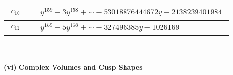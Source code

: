 \documentclass[1p]{elsarticle_modified}
\theoremstyle{definition}
\begin{document}
\begin{tabular}{m{50pt}|m{274pt}}
\hline $$\begin{aligned}c_{10}\end{aligned}$$&$\begin{aligned}
&y^{159}-3 y^{158}+\cdots-53018876444672 y-2138239401984
\end{aligned}$\\
\hline $$\begin{aligned}c_{12}\end{aligned}$$&$\begin{aligned}
&y^{159}-5 y^{158}+\cdots+327496385 y-1026169
\end{aligned}$\\
\hline
\end{tabular}\\~\\
\newpage\flushleft \textbf{(vi) Complex Volumes and Cusp Shapes}
\end{document}
